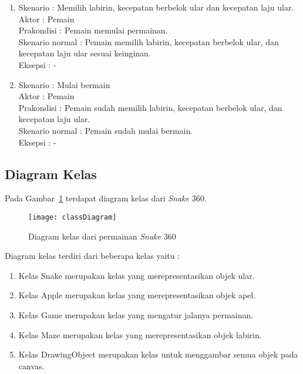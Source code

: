 \begin{enumerate}
	\item Skenario : Memilih labirin, kecepatan berbelok ular dan kecepatan laju ular. \\
Aktor : Pemain \\
Prakondisi : Pemain memulai permainan.\\
Skenario normal : Pemain memilih labirin, kecepatan berbelok ular, dan kecepatan laju ular sesuai keinginan. \\
Eksepsi : - \\

	\item Skenario : Mulai bermain \\
Aktor : Pemain \\
Prakondisi : Pemain sudah memilih labirin, kecepatan berbelok ular, dan kecepatan laju ular. \\
Skenario normal : Pemain sudah mulai bermain. \\ 
Eksepsi : - \\
\end{enumerate}

\subsection{Diagram Kelas}
Pada Gambar~\ref{fig:classDiagram} terdapat diagram kelas dari \textit{Snake} 360.

\begin{figure}[H]
	\centering  
	\texttt{[image: classDiagram]}  
	\caption[Diagram class dari permainan \textit{Snake} 360]{Diagram kelas dari permainan \textit{Snake} 360}
	\label{fig:classDiagram} 
\end{figure}

Diagram kelas terdiri dari beberapa kelas yaitu :

\begin{enumerate}
	\item Kelas Snake merupakan  kelas yang merepresentasikan objek ular.
	\item Kelas Apple merupakan kelas yang merepresentasikan objek apel.
	\item Kelas Game merupakan kelas yang mengatur jalanya permainan.
	\item Kelas Maze merupakan kelas yang merepresentasikan objek labirin.
	\item Kelas DrawingObject merupakan kelas untuk menggambar semua objek pada canvas.
\end{enumerate}

